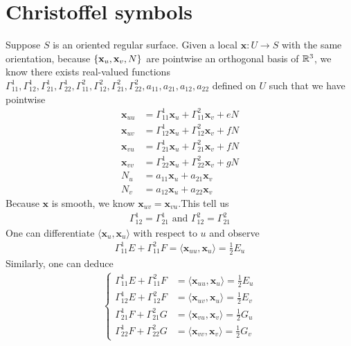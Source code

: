 \documentclass{report}
\begin{document}
\section{Christoffel symbols} 
\begin{mdframed}
Suppose $S$ is an oriented regular surface. Given a local $\textbf{x}:U\rightarrow S$ with the same orientation, because $\{ \textbf{x}_u,\textbf{x}_v,N \}$ are pointwise an orthogonal basis of $\mathbb{R}^3$, we know there exists real-valued functions $\Gamma^1_{11},\Gamma ^1_{12},\Gamma ^1_{21},\Gamma^1_{22},\Gamma^2_{11},\Gamma ^2_{12},\Gamma ^2_{21},\Gamma^2_{22},a_{11},a_{21},a_{12},a_{22}$  defined on $U$  such that we have pointwise
\begin{align*}
\textbf{x}_{uu}&= \Gamma^1_{11}\textbf{x}_u + \Gamma^2_{11}\textbf{x}_v + eN\\
\textbf{x}_{uv}&=\Gamma ^1_{12}\textbf{x}_u + \Gamma ^2_{12}\textbf{x}_v + fN\\
\textbf{x}_{vu}&=\Gamma^1_{21} \textbf{x}_u + \Gamma ^2_{21}\textbf{x}_v+ fN \\
\textbf{x}_{vv}&=\Gamma ^1_{22} \textbf{x}_u + \Gamma^2_{22}\textbf{x}_v + gN\\
N_u&=a_{11}\textbf{x}_u + a_{21}\textbf{x}_v\\
N_v&=a_{12}\textbf{x}_u+ a_{22}\textbf{x}_v
\end{align*}
Because $\textbf{x}$ is smooth, we know $\textbf{x}_{uv}=\textbf{x}_{vu}$.This tell us 
\begin{align*}
\Gamma^1_{12}=\Gamma^1_{21}\text{ and }\Gamma^2_{12}=\Gamma ^2_{21}
\end{align*}
One can differentiate $\langle \textbf{x}_u , \textbf{x}_u\rangle $ with respect to $u$ and observe 
\begin{align*}
\Gamma^1_{11}E+ \Gamma^2_{11}F= \langle \textbf{x}_{uu},\textbf{x}_u\rangle = \frac{1}{2}E_u
\end{align*}
Similarly, one can deduce 
\begin{align*}
\begin{cases}
  \Gamma^1_{11}E+\Gamma^2_{11}F&= \langle \textbf{x}_{uu},\textbf{x}_u\rangle =\frac{1}{2}E_u\\
  \Gamma^1_{12}E+ \Gamma ^2_{12}F&=\langle \textbf{x}_{uv},\textbf{x}_u\rangle = \frac{1}{2}E_v\\
 \Gamma^1_{21}F+\Gamma^2_{21}G &=\langle \textbf{x}_{vu},\textbf{x}_v\rangle = \frac{1}{2}G_u \\
\Gamma^1_{22}F+ \Gamma^2_{22}G &=\langle \textbf{x}_{vv},\textbf{x}_v\rangle = \frac{1}{2}G_v

\end{cases}
\end{align*}
\end{mdframed}
\end{document}
